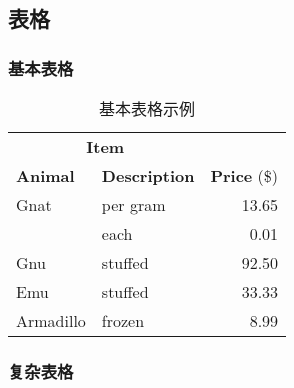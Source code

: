 \subsection{表格}

\subsubsection{基本表格}

\begin{table}[!hpt]
    \caption{基本表格示例}
    \centering
    \begin{tabular}{@{}llr@{}} \toprule
        \multicolumn{2}{c}{\textbf{Item}}                            \\ \cmidrule(r){1-2}
        \textbf{Animal} & \textbf{Description} & \textbf{Price} (\$) \\ \midrule
        Gnat            & per gram             & 13.65               \\
                        & each                 & 0.01                \\
        Gnu             & stuffed              & 92.50               \\
        Emu             & stuffed              & 33.33               \\
        Armadillo       & frozen               & 8.99                \\ \bottomrule
    \end{tabular}
\end{table}

\subsubsection{复杂表格}

